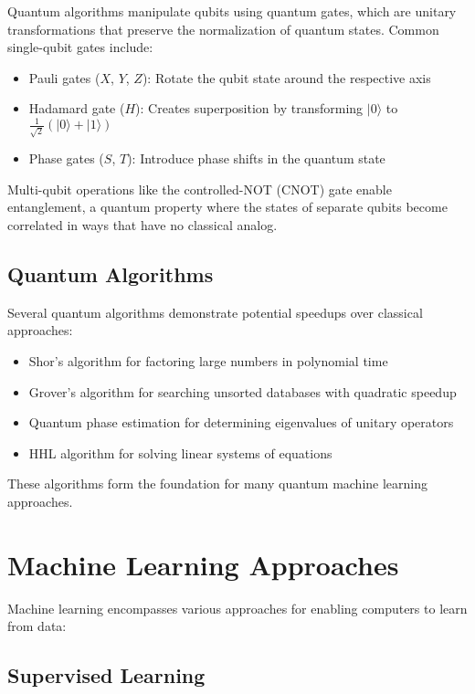 \documentclass[12pt,a4paper]{article}
\begin{document}
Quantum algorithms manipulate qubits using quantum gates, which are unitary transformations that preserve the normalization of quantum states. Common single-qubit gates include:

\begin{itemize}
    \item Pauli gates ($X$, $Y$, $Z$): Rotate the qubit state around the respective axis
    \item Hadamard gate ($H$): Creates superposition by transforming $|0\rangle$ to $\frac{1}{\sqrt{2}}(|0\rangle + |1\rangle)$
    \item Phase gates ($S$, $T$): Introduce phase shifts in the quantum state
\end{itemize}

Multi-qubit operations like the controlled-NOT (CNOT) gate enable entanglement, a quantum property where the states of separate qubits become correlated in ways that have no classical analog.

\subsection{Quantum Algorithms}

Several quantum algorithms demonstrate potential speedups over classical approaches:

\begin{itemize}
    \item Shor's algorithm for factoring large numbers in polynomial time \citep{Shor1997}
    \item Grover's algorithm for searching unsorted databases with quadratic speedup \citep{Grover1996}
    \item Quantum phase estimation for determining eigenvalues of unitary operators \citep{Kitaev1995}
    \item HHL algorithm for solving linear systems of equations \citep{Harrow2009}
\end{itemize}

These algorithms form the foundation for many quantum machine learning approaches.

\section{Machine Learning Approaches}

Machine learning encompasses various approaches for enabling computers to learn from data:

\subsection{Supervised Learning}
\end{document}
